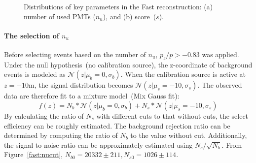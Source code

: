 \begin{figure}[!htbp]
	\caption{Distributions of key parameters in the Fast reconstruction: (a) number of used PMTs ($n_u$), and (b) score~($s$).}
	\label{fast:pzcombined}
\end{figure}

\paragraph{The selection of $n_u$}
Before selecting events based on the number of $n_u$, $p_z/p>-0.83$ was applied. Under the null hypothesis~(no calibration source), the z-coordinate of background events is modeled as $\mathcal{N} (z \vert \mu_b=0, \sigma_b)$. When the calibration source is active at $z=-10$\si{m}, the signal distribution becomes $\mathcal{N} (z \vert \mu_s=-10, \sigma_s)$. The observed data are therefore fit to a mixture model~(Mix Gauss fit):
\begin{equation}
	f(z)=N_b*\mathcal{N} (z \vert \mu_b=0, \sigma_b)+N_s*\mathcal{N} (z \vert \mu_s=-10, \sigma_s)
	\label{eq:2g}
\end{equation}
By calculating the ratio of $N_s$ with different cuts to that without cuts, the select efficiency can be roughly estimated. The background rejection ratio can be determined by computing the ratio of $N_b$ to the value without cut. Additionally, the signal-to-noise ratio can be approximately estimated using $N_s/\sqrt{N_b}$. From Figure~\ref{fast:nucut}, $N_{b0}=20332\pm211, N_{s0}=1026\pm114$.

